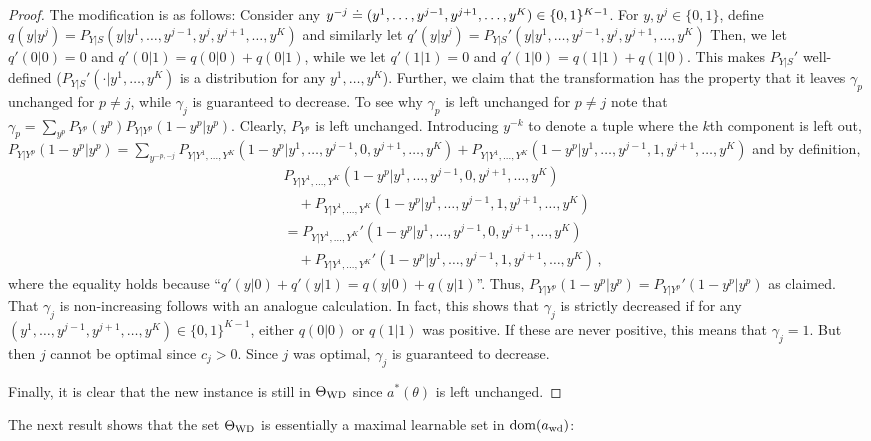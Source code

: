 \begin{proof}
	The modification is as follows:
	Consider any $y^{-j} \doteq (y^1,\dots,y^{j-1},y^{j+1},\dots,y^K)\in \{0,1\}^{K-1}$.
	For $y,y^j\in \{0,1\}$, define 
	$q(y|y^j) = P_{Y|S}(y|y^1, \dots, y^{j-1}, y^j, y^{j+1},\dots, y^K)$
	and similarly let
	$q'(y|y^j) = P_{Y|S}'(y|y^1, \dots, y^{j-1}, y^j, y^{j+1},\dots, y^K)$
	Then, we let $q'(0|0) = 0$ and $q'(0|1) = q(0|0) + q(0|1)$,
	while we let  $q'(1|1) = 0$ and $q'(1|0) = q(1|1) + q(1|0)$.
	This makes $P_{Y|S}'$ well-defined ($P_{Y|S}'(\cdot|y^1,\dots,y^K)$ is a distribution for any $y^1,\dots,y^K$).
	Further, we claim that the transformation has the property that 
	it leaves $\gamma_p$ unchanged for $p\ne j$, while $\gamma_j$ is guaranteed to decrease.
	To see why $\gamma_p$ is left unchanged for $p\ne j$ note that
	$\gamma_p = \sum_{y^p}  P_{Y^p}(y^p) P_{Y|Y^p}(1-y^p|y^p)$.
	Clearly, $P_{Y^p}$ is left unchanged.
	Introducing $y^{-k}$ to denote a tuple where the $k$th component is left out,
	$P_{Y|Y^p}(1-y^p|y^p) = \sum_{y^{-p,-j}} P_{Y|Y^1,\dots,Y^K}( 1-y^p | y^1,\dots, y^{j-1}, 0, y^{j+1}, \dots, y^K )
	+P_{Y|Y^1,\dots,Y^K}( 1-y^p | y^1,\dots, y^{j-1}, 1, y^{j+1}, \dots, y^K )$
	and by definition,
	\begin{align*}
	& P_{Y|Y^1,\dots,Y^K}( 1-y^p | y^1,\dots, y^{j-1}, 0, y^{j+1}, \dots, y^K )\\
	&\quad +P_{Y|Y^1,\dots,Y^K}( 1-y^p | y^1,\dots, y^{j-1}, 1, y^{j+1}, \dots, y^K )\\
	&
	=
	P_{Y|Y^1,\dots,Y^K}'( 1-y^p | y^1,\dots, y^{j-1}, 0, y^{j+1}, \dots, y^K )\\
	&\quad+P_{Y|Y^1,\dots,Y^K}'( 1-y^p | y^1,\dots, y^{j-1}, 1, y^{j+1}, \dots, y^K )\,,
	\end{align*}
	where the equality holds because ``$q'(y|0)+q'(y|1) = q(y|0) + q(y|1)$''.
	Thus, $P_{Y|Y^p}(1-y^p|y^p) = P_{Y|Y^p}'(1-y^p|y^p)$ as claimed.
	That $\gamma_j$ is non-increasing follows with an analogue calculation.
	In fact, this shows that $\gamma_j$ is strictly decreased
	if for any $(y^1,\dots,y^{j-1},y^{j+1},\dots,y^K)\in \{0,1\}^{K-1}$, either $q(0|0)$ or $q(1|1)$ was positive.
	If these are never positive, this means that $\gamma_j=1$. 
	But then $j$ cannot be optimal since $c_j>0$.
	Since $j$ was optimal, $\gamma_j$ is guaranteed to decrease.
	
	Finally, it is clear that the new instance is still in $\Theta_{\mathrm{WD}}$ since  $a^*(\theta)$ is left unchanged.
\end{proof}
The next result shows that
the set $\Theta_{\mathrm{WD}}$ is essentially a maximal learnable set in $\mathrm{dom}(a_{\mathrm{wd}})$:

